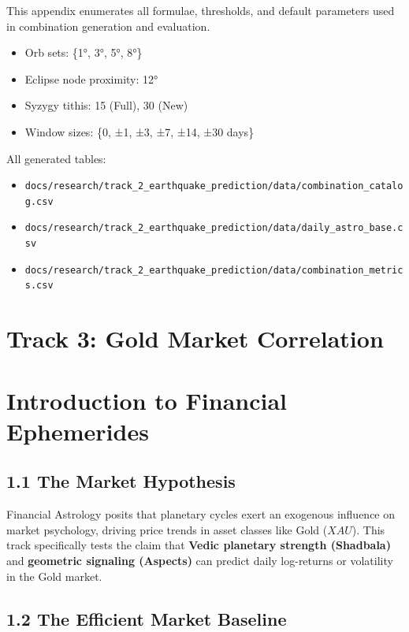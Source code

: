 \documentclass[
  11pt,
  a4paper,
  oneside,
  openany]{report}
\providecommand{\tightlist}{%
  \setlength{\itemsep}{0pt}\setlength{\parskip}{0pt}}\usepackage{longtable,booktabs,array}
\begin{document}
This appendix enumerates all formulae, thresholds, and default
parameters used in combination generation and evaluation.

\begin{itemize}
\tightlist
\item
  Orb sets: \{1°, 3°, 5°, 8°\}
\item
  Eclipse node proximity: 12°
\item
  Syzygy tithis: 15 (Full), 30 (New)
\item
  Window sizes: \{0, ±1, ±3, ±7, ±14, ±30 days\}
\end{itemize}

All generated tables:

\begin{itemize}
\tightlist
\item
  \texttt{docs/research/track\_2\_earthquake\_prediction/data/combination\_catalog.csv}
\item
  \texttt{docs/research/track\_2\_earthquake\_prediction/data/daily\_astro\_base.csv}
\item
  \texttt{docs/research/track\_2\_earthquake\_prediction/data/combination\_metrics.csv}
\end{itemize}

\newpage

\chapter{Track 3: Gold Market
Correlation}\label{track-3-gold-market-correlation}

\chapter{Introduction to Financial
Ephemerides}\label{introduction-to-financial-ephemerides}

\section{1.1 The Market Hypothesis}\label{the-market-hypothesis}

Financial Astrology posits that planetary cycles exert an exogenous
influence on market psychology, driving price trends in asset classes
like Gold (\(XAU\)). This track specifically tests the claim that
\textbf{Vedic planetary strength (Shadbala)} and \textbf{geometric
signaling (Aspects)} can predict daily log-returns or volatility in the
Gold market.

\section{1.2 The Efficient Market
Baseline}\label{the-efficient-market-baseline}
\end{document}
